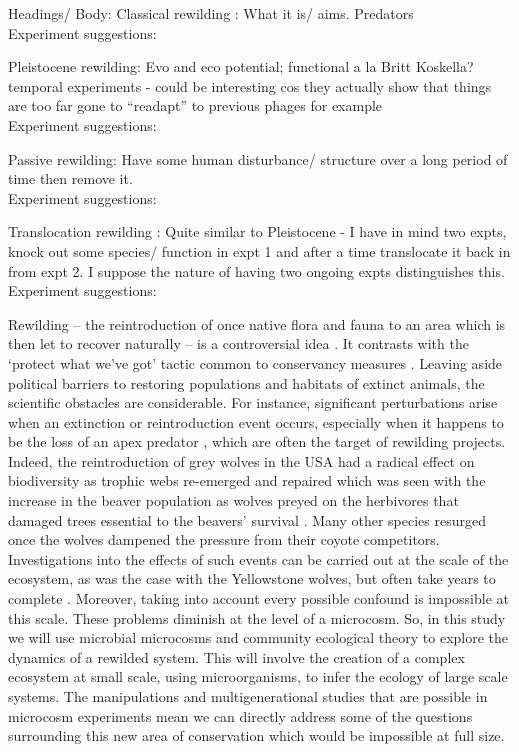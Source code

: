 \documentclass[a4paper,12pt]{article}
\begin{document}
Headings/ Body:
Classical rewilding : 
What it is/ aims. Predators \\
Experiment suggestions: 

Pleistocene rewilding: Evo and eco potential; functional a la Britt Koskella? temporal experiments - could be interesting cos they actually show that things are too far gone to “readapt” to previous phages for example \\
Experiment suggestions: 

Passive rewilding: Have some human disturbance/ structure over a long period of time then remove it. \\
Experiment suggestions: 

Translocation rewilding : Quite similar to Pleistocene - I have in mind two expts, knock out some species/ function in expt 1 and after a time translocate it back in from expt 2. I suppose the nature of having two ongoing expts distinguishes this. \\
Experiment suggestions: 

\bigskip
Rewilding – the reintroduction of once native flora and fauna to an area which is then let to recover naturally – is a controversial idea \citep{monbiot2013feral}.  
It contrasts with the ‘protect what we’ve got’ tactic common to conservancy measures \citep{monbiot2013feral}. 
Leaving aside political barriers to restoring populations and habitats of extinct animals, the scientific obstacles are considerable. 
For instance, significant perturbations arise when an extinction or reintroduction event occurs, especially when it happens to be the loss of an apex predator \citep{mittelbach1995perturbation}, which are often the target of rewilding projects. 
Indeed, the reintroduction of grey wolves in the USA had a radical effect on biodiversity as trophic webs re-emerged and repaired which was seen with the increase in the beaver population as wolves preyed on the herbivores that damaged trees essential to the beavers’ survival \citep{hebblewhite2005human}.  
Many other species resurged once the wolves dampened the pressure from their coyote competitors. 
Investigations into the effects of such events can be carried out at the scale of the ecosystem, as was the case with the Yellowstone wolves, but often take years to complete \citep{mittelbach1995perturbation}.  
Moreover, taking into account every possible confound is impossible at this scale. 
These problems diminish at the level of a microcosm. 
So, in this study we will use microbial microcosms and community ecological theory to explore the dynamics of a rewilded system. 
This will involve the creation of a complex ecosystem at small scale, using microorganisms, to infer the ecology of large scale systems. 
The manipulations and multigenerational studies that are possible in microcosm experiments mean we can directly address some of the questions surrounding this new area of conservation which would be impossible at full size. 
\end{document}
